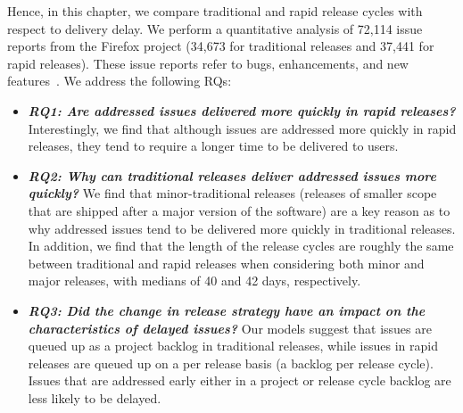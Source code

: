 Hence, in this chapter, we compare traditional and rapid release cycles with
respect to delivery delay. We perform a quantitative analysis of 72,114 issue
reports from the Firefox project (34,673 for traditional releases and 37,441 for
rapid releases). These issue reports refer to bugs, enhancements, and new
features~\cite{giuliano2008}. We address the following RQs:
%

\begin{itemize}

	\item \textbf{\textit{RQ1: Are addressed issues delivered more quickly
		in rapid releases?}} Interestingly, we find that although issues
		are addressed more quickly in rapid releases, they tend to
		require a longer time to be delivered to users.\\

	\item \textbf{\textit{RQ2: Why can traditional releases deliver
		addressed issues more quickly?}} We find that minor-traditional
		releases (\ie releases of smaller scope that are shipped after a
		major version of the software) are a key reason as to why
		addressed issues tend to be delivered more quickly in
		traditional releases. In addition, we find that the length of
		the release cycles are roughly the same between traditional and
		rapid releases when considering both minor and major releases,
		with medians of 40 and 42 days, respectively.\\

	\item \textbf{\textit{RQ3: Did the change in release strategy have an
		impact on the characteristics of delayed issues?}} Our models
		suggest that issues are queued up as a project backlog in
		traditional releases, while issues in rapid releases are queued
		up on a per release basis (\ie a backlog per release cycle).
		Issues that are addressed early either in a project or release
		cycle backlog are less likely to be delayed.
\end{itemize}  

